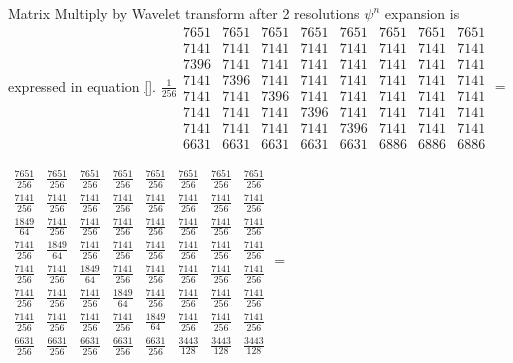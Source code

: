 \documentclass{article}
\begin{document}
Matrix Multiply by Wavelet transform after 2 resolutions $\psi ^{n}$ expansion is expressed in equation \ref{}. 
\newline
$\frac{1}{256}
\begin{array}{cccccccc}
7651 & 7651 & 7651 & 7651 & 7651 & 7651 & 7651 & 7651 \\ 
7141 & 7141 & 7141 & 7141 & 7141 & 7141 & 7141 & 7141 \\ 
7396 & 7141 & 7141 & 7141 & 7141 & 7141 & 7141 & 7141 \\ 
7141 & 7396 & 7141 & 7141 & 7141 & 7141 & 7141 & 7141 \\ 
7141 & 7141 & 7396 & 7141 & 7141 & 7141 & 7141 & 7141 \\ 
7141 & 7141 & 7141 & 7396 & 7141 & 7141 & 7141 & 7141 \\ 
7141 & 7141 & 7141 & 7141 & 7396 & 7141 & 7141 & 7141 \\ 
6631 & 6631 & 6631 & 6631 & 6631 & 6886 & 6886 & 6886
\end{array}
=$

$\allowbreak 
\begin{array}{cccccccc}
\frac{7651}{256} & \frac{7651}{256} & \frac{7651}{256} & \frac{7651}{256} & 
\frac{7651}{256} & \frac{7651}{256} & \frac{7651}{256} & \frac{7651}{256} \\ 
\frac{7141}{256} & \frac{7141}{256} & \frac{7141}{256} & \frac{7141}{256} & 
\frac{7141}{256} & \frac{7141}{256} & \frac{7141}{256} & \frac{7141}{256} \\ 
\frac{1849}{64} & \frac{7141}{256} & \frac{7141}{256} & \frac{7141}{256} & 
\frac{7141}{256} & \frac{7141}{256} & \frac{7141}{256} & \frac{7141}{256} \\ 
\frac{7141}{256} & \frac{1849}{64} & \frac{7141}{256} & \frac{7141}{256} & 
\frac{7141}{256} & \frac{7141}{256} & \frac{7141}{256} & \frac{7141}{256} \\ 
\frac{7141}{256} & \frac{7141}{256} & \frac{1849}{64} & \frac{7141}{256} & 
\frac{7141}{256} & \frac{7141}{256} & \frac{7141}{256} & \frac{7141}{256} \\ 
\frac{7141}{256} & \frac{7141}{256} & \frac{7141}{256} & \frac{1849}{64} & 
\frac{7141}{256} & \frac{7141}{256} & \frac{7141}{256} & \frac{7141}{256} \\ 
\frac{7141}{256} & \frac{7141}{256} & \frac{7141}{256} & \frac{7141}{256} & 
\frac{1849}{64} & \frac{7141}{256} & \frac{7141}{256} & \frac{7141}{256} \\ 
\frac{6631}{256} & \frac{6631}{256} & \frac{6631}{256} & \frac{6631}{256} & 
\frac{6631}{256} & \frac{3443}{128} & \frac{3443}{128} & \frac{3443}{128}
\end{array}
\allowbreak =$
\end{document}

